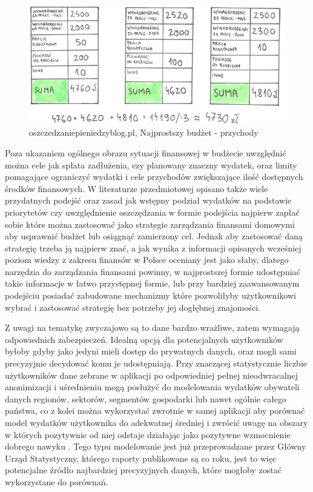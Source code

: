 \documentclass[a4paper,10pt, twoside]{report}
\begin{document}
\begin{large}
\begin{figure}[H]           %
    \centering
    \includegraphics[width=12cm]{figures/oszczedzaniepieniedzyblog-pl_przychody.jpg}
    \caption{oszczedzaniepieniedzyblog.pl, Najprostszy budżet - przychody}
    \label{fig:prostybudżetprzychody}
\end{figure}

{Poza ukazaniem ogólnego obrazu sytuacji finansowej w budżecie uwzględnić można 
cele jak spłata zadłużenia, czy planowany znaczny wydatek, oraz limity 
pomagające ograniczyć wydatki i cele przychodów zwiększające ilość dostępnych 
środków finansowych. W literaturze przedmiotowej opisano także wiele przydatnych
 podejść oraz zasad jak wstępny podział wydatków na podstawie 
priorytetów \cite{najbogatszyczlowiekwbabilonie} czy uwzględnienie oszczędzania 
w formie podejścia najpierw zapłać sobie \cite{najbogatszyczlowiekwbabilonie}
 \cite{finansowaforteca} które można zastosować jako strategie zarządzania 
finansami domowymi aby usprawnić budżet lub osiągnąć zamierzony cel. Jednak aby 
zastosować daną strategię trzeba ją najpierw znać, a jak wynika z informacji 
opisanych wcześniej poziom wiedzy z zakresu finansów w Polsce oceniany jest jako
 słaby, dlatego narzędzia do zarządzania finansami powinny, w najprostszej 
formie udostępniać takie informacje w łatwo przystępnej formie, lub przy 
bardziej zaawansowanym podejściu posiadać zabudowane mechanizmy które 
pozwoliłyby użytkownikowi wybrać i zastosować strategię bez potrzeby jej 
dogłębnej znajomości.}

{Z uwagi na tematykę zwyczajowo są to dane bardzo wrażliwe, zatem wymagają 
odpowiednich zabezpieczeń. Idealną opcją dla potencjalnych użytkowników byłoby 
gdyby jako jedyni mieli dostęp do prywatnych danych, oraz mogli sami precyzyjnie
 decydować komu je udostępniają. Przy znaczącej statystycznie liczbie 
użytkowników dane zebrane w aplikacji po odpowiedniej pełnej nieodwracalnej 
anonimizacji i uśrednieniu mogą posłużyć do modelowania wydatków obywateli 
danych regionów, sektorów, segmentów gospodarki lub nawet ogólnie całego 
państwa, co z kolei można wykorzystać zwrotnie w samej aplikacji aby porównać 
model wydatków użytkownika do adekwatnej średniej i zwrócić uwagę na obszary w 
których pozytywnie od niej odstaje działając jako pozytywne wzmocnienie 
dobrego nawyku \cite{pozytywnewzmocnienie}. Tego typu modelowanie jest już 
przeprowadzane przez Główny Urząd Statystyczny, którego raporty publikowane są 
co roku, jest to więc potencjalne źródło najbardziej precyzyjnych danych, które 
mogłoby zostać wykorzystane do porównań.}



\end{large}
\end{document}
